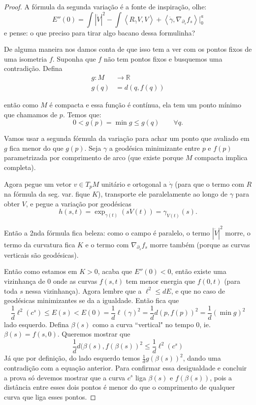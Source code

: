 \begin{proof}
       A fórmula da segunda variação é a
       fonte de inspiração, olhe:
$$
E''(0)=\int |\dot V|^2-\int\left\langle{}R_ {\dot
\gamma}V,V\right\rangle{}+\left\langle{}\dot\gamma,
\nabla_{\partial_s}f_s\right\rangle{}|_{0}^a
$$
e pense: o que preciso para tirar algo bacano
dessa formulinha?

De alguma maneira nos damos conta de que isso
tem a ver com os pontos fixos de
uma isometria $f$. Suponha que $f$ não tem
pontos fixos e busquemos uma
contradição. Defina
$$
\begin{aligned}
g: M &\longrightarrow \mathbb{R} \\
g(q) &=d(q,f(q))
\end{aligned}
$$

então como $M$ é compacta e essa função é
contínua, ela tem um ponto mínimo que
chamamos de $p$. Temos que:
$$
0<g(p)=\operatorname{min}g\leq g(q)\qquad
\forall q.
$$

Vamos usar a segunda fórmula da variação para
achar um ponto que avaliado em $g$
fica menor do que $g(p)$. Seja $\gamma$ a
geodésica minimizante entre $p$ e
$f(p)$ parametrizada por comprimento de arco
(que existe porque $M$ compacta
implica completa).

Agora pegue um vetor $v \in T_pM$ unitário e
ortogonal a $\dot \gamma$ (para que
o termo com $R$ na fórmula da seg. var. fique
$K$), transporte ele paralelamente
ao longo de $\gamma$ para obter $V$, e pegue
a variação por geodésicas
\[h(s,t)=\operatorname{exp}_{\gamma(t)}(sV(t)
)=\gamma_{V(t)}(s).\]

Então a 2nda fórmula fica beleza: como o
campo é paralelo, o termo $|\dot V|^2$
morre, o termo da curvatura fica $K$ e o
termo com $\nabla_{\partial_s}f_s$
morre também (porque as curvas verticais são
geodésicas).

Então como estamos em $K>0$, acaba que
$E''(0)<0$, então existe uma vizinhança
de $0$  onde as curvas $f(s,t)$ tem menor
energia que $f(0,t)$ (para toda $s$
nessa  vizinhança). Agora lembre que a
$\ell^2 \leq dE$, e que no caso de
geodésicas minimizantes se da a igualdade.
Então fica que
$$
\frac{1}{d}\ell^2(c^s)\leq
E(s)<E(0)=\frac{1}{d}\ell(\gamma)^2=\frac{1}
{d}d(p,f(p))^2
=\frac{1}{d}(\operatorname{min}g)^2
$$
lado esquerdo. Defina $\beta(s)$ como a curva
``vertical" no tempo 0, ie.
$\beta(s)=f(s,0)$. Queremos mostrar que
$$
\frac{1}{d}d(\beta(s),f(\beta(s))^2\leq
\frac{1}{d}\ell^2(c^s)
$$
Já que por definição, do lado esquerdo temos
$\frac{1}{d}g(\beta(s))^2$, dando
uma contradição com a equação anterior. Para
confirmar essa desigualdade e
concluir a prova só devemos mostrar que a
curva $c^s$ liga $\beta(s)$ e
$f(\beta(s))$, pois a distância entre esses
dois pontos é menor do que o
comprimento de qualquer curva que liga esses
pontos.


\end{proof}
